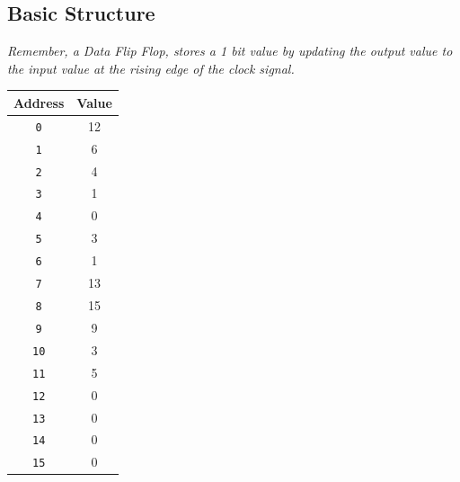 \subsection{Basic Structure}
\textit{Remember, a Data Flip Flop, stores a 1 bit value by updating the output value to the input value at the rising edge of the clock signal.} \\ \vspace*{5px}
\begin{minipage}[htp]{0.45\textwidth} 
\begin{center}
    \begin{tabular}{|c|c|}
        \hline
        \textbf{Address} & \textbf{Value} \\ 
        \hline
        \texttt{0} & 12 \\ 
        \hline
        \texttt{1} & 6 \\ 
        \hline
        \texttt{2} & 4 \\ 
        \hline
        \texttt{3} & 1 \\ 
        \hline
        \texttt{4} & 0 \\ 
        \hline
        \texttt{5} & 3 \\ 
        \hline
        \texttt{6} & 1 \\ 
        \hline
        \texttt{7} & 13 \\ 
        \hline
        \texttt{8} & 15 \\ 
        \hline
        \texttt{9} & 9 \\ 
        \hline
        \texttt{10} & 3 \\ 
        \hline
        \texttt{11} & 5 \\ 
        \hline
        \texttt{12} & 0 \\ 
        \hline
        \texttt{13} & 0 \\ 
        \hline
        \texttt{14} & 0 \\ 
        \hline
        \texttt{15} & 0 \\ 
        \hline
        \end{tabular}
\end{center}
\end{minipage}
\hfill
\vline
\hfill
